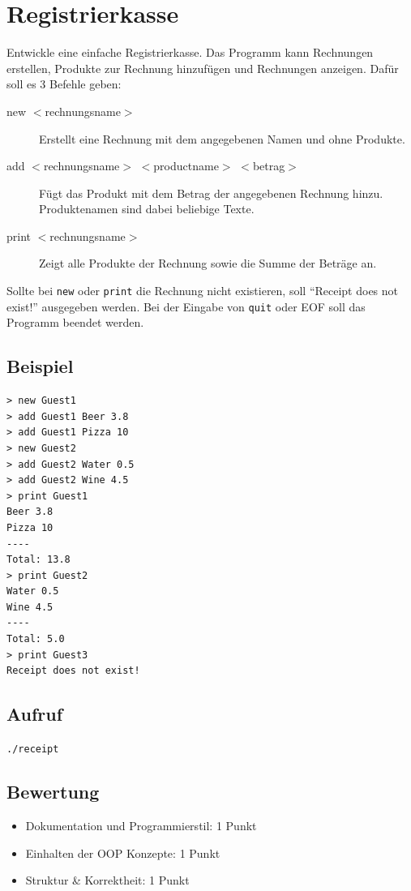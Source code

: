 \documentclass[a4paper,10pt]{article}
\begin{document}
\section*{Registrierkasse}

Entwickle eine einfache Registrierkasse. Das Programm kann Rechnungen erstellen, Produkte zur Rechnung hinzufügen und Rechnungen anzeigen. Dafür soll es 3 Befehle geben:

\begin{description}
 \item[new $<$rechnungsname$>$] Erstellt eine Rechnung mit dem angegebenen Namen und ohne Produkte.
 \item[add $<$rechnungsname$>$ $<$productname$>$ $<$betrag$>$] Fügt das Produkt mit dem Betrag der angegebenen Rechnung hinzu. Produktenamen sind dabei beliebige Texte.
 \item[print $<$rechnungsname$>$] Zeigt alle Produkte der Rechnung sowie die Summe der Beträge an.
\end{description}

Sollte bei \texttt{new} oder \texttt{print} die Rechnung nicht existieren, soll ``Receipt does not exist!'' ausgegeben werden. Bei der Eingabe von \texttt{quit} oder EOF soll das Programm beendet werden.

\subsection*{Beispiel}
\begin{verbatim}
> new Guest1
> add Guest1 Beer 3.8
> add Guest1 Pizza 10
> new Guest2
> add Guest2 Water 0.5
> add Guest2 Wine 4.5
> print Guest1
Beer 3.8
Pizza 10
----
Total: 13.8
> print Guest2
Water 0.5
Wine 4.5
----
Total: 5.0
> print Guest3
Receipt does not exist!
\end{verbatim}

\subsection*{Aufruf}
\texttt{./receipt}

\subsection*{Bewertung}
\begin{itemize}
 \item Dokumentation und Programmierstil: 1 Punkt
 \item Einhalten der OOP Konzepte: 1 Punkt
 \item Struktur \& Korrektheit: 1 Punkt
\end{itemize}

\newpage
\end{document}
